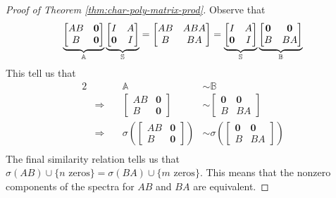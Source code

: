\begin{proof}[Proof of Theorem \ref{thm:char-poly-matrix-prod}]
Observe that
$$
\underbrace{\begin{bmatrix}
AB & \textbf{0} \\
B & \textbf{0}
\end{bmatrix}}_{\Large \mathbb{A}}
\underbrace{\begin{bmatrix}
I & A \\
\textbf{0} & I
\end{bmatrix}}_{\Large \mathbb{S}}
=
\begin{bmatrix}
AB & ABA \\
B & BA
\end{bmatrix}
=
\underbrace{\begin{bmatrix}
I & A \\
\textbf{0} & I
\end{bmatrix}}_{\Large \mathbb{S}}
\underbrace{\begin{bmatrix}
\textbf{0} & \textbf{0} \\
B & BA
\end{bmatrix}}_{\Large \mathbb{B}}
$$
This tell us that 
\begin{alignat*}{2}
 &&\mathbb{A} &\sim \mathbb{B} \\
 &\Longrightarrow \quad &
     \begin{bmatrix}
     AB & \textbf{0} \\ 
     B & \textbf{0}
     \end{bmatrix}
     &\sim 
     \begin{bmatrix}
     \textbf{0} & \textbf{0} \\
     B & BA
     \end{bmatrix} \\
 &\Longrightarrow \quad &
     \sigma \left(
     \begin{bmatrix}
     AB & \textbf{0} \\ 
     B & \textbf{0}
     \end{bmatrix}
     \right)
     &\sim 
     \sigma \left(
     \begin{bmatrix}
     \textbf{0} & \textbf{0} \\
     B & BA
     \end{bmatrix}
     \right) \\
\end{alignat*}
The final similarity relation tells us that $\sigma(AB) \cup \{n \text{ zeros}\} = \sigma(BA) \cup \{m \text{ zeros}\}$. This means that the nonzero components of the spectra for $AB$ and $BA$ are equivalent.
\end{proof}

